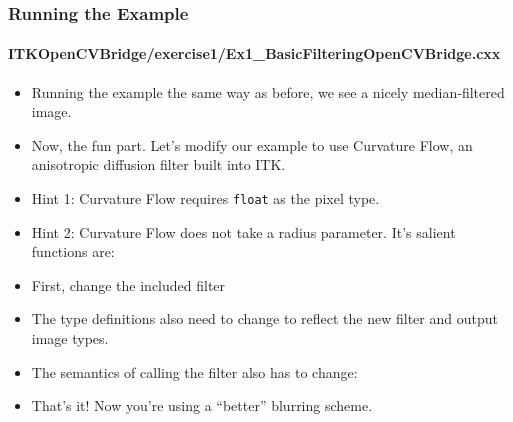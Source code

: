 \begin{frame}
\frametitle{Running the Example}
\framesubtitle{ITKOpenCVBridge/exercise1/Ex1\_BasicFilteringOpenCVBridge.cxx}
\begin{itemize}
\item Running the example the same way as before, we see a nicely
median-filtered image.
\pause
\item Now, the fun part. Let's modify our example to use Curvature Flow, an
anisotropic diffusion filter built into ITK.
\end{itemize}
\end{frame}

\begin{frame}
\begin{itemize}
\frametitle{Exercise 1}
\framesubtitle{ITKOpenCVBridge/exercise1/Ex1\_BasicFilteringOpenCVBridge.cxx}
\item Hint 1: Curvature Flow requires {\tt float} as the pixel
  type.
\pause
\item Hint 2: Curvature Flow does not take a radius parameter. It's
  salient functions are:
\end{itemize}
\end{frame}

\begin{frame}
\begin{itemize}
\frametitle{Exercise 1 (Answer)}
\framesubtitle{ITKOpenCVBridge/exercise1/Ex1\_BasicFilteringOpenCVBridgeAnswer.cxx}
\item First, change the included filter
\pause
\item The type definitions also need to change to reflect the new
  filter and output image types.
\end{itemize}
\end{frame}

\begin{frame}
\begin{itemize}
\frametitle{Exercise 1 (Answer)}
\framesubtitle{ITKOpenCVBridge/exercise1/Ex1\_BasicFilteringOpenCVBridgeAnswer.cxx}
\item The semantics of calling the filter also has to change:
\pause
\item That's it! Now you're using a ``better'' blurring scheme.
\end{itemize}
\end{frame}

